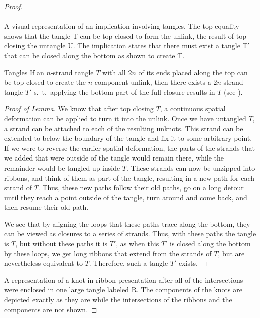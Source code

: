 \begin{paper}
\begin{proof}
{\vspace{-4em}\hspace{0.3in}\hspace{14.8ex}\\

\vspace{-4.3em}\hfill{}\\}
{A visual representation of an implication involving tangles.
The top equality shows that the tangle T can be top closed to
form the unlink, the result of top closing the untangle U.
The implication states that there must exist a tangle T' that can be closed
along the bottom as shown to create T.}

\begin{paperlem}{Tangles}
If an $n$-strand tangle $T$ with all $2n$ of its ends placed along the top can
be top closed to create the $n$-component unlink, then there exists a
$2n$-strand tangle $T'$ s.~t.~applying the bottom part of the full closure
results in $T$ (see \figLemma).
\end{paperlem}

\begin{proof}[Proof of Lemma]
We know that after top closing $T$, a continuous spatial deformation can be
applied to turn it into the unlink.
Once we have untangled $T$, a strand can be attached to each of the resulting
unknots.
This strand can be extended to below the boundary of the tangle and fix it to
some arbitrary point.
If we were to reverse the earlier spatial deformation, the parts of the strands
that we added that were outside of the tangle would remain there, while the
remainder would be tangled up inside $T$.
These strands can now be unzipped into ribbons, and think of them as part of the
tangle, resulting in a new path for each strand of $T$.
Thus, these new paths follow their old paths, go on a long detour until they
reach a point outside of the tangle, turn around and come back, and then resume
their old path.

We see that by aligning the loops that these paths trace along the bottom,
they can be viewed as closures to a series of strands.
Thus, with these paths the tangle is $T$, but without these paths it is $T'$,
as when this $T'$ is closed along the bottom by these loops, we get long ribbons
that extend from the strands of $T$, but are nevertheless equivalent to $T$.
Therefore, such a tangle $T'$ exists.
\end{proof}

{A representation of a knot in ribbon presentation after all of the
intersections were enclosed in one large tangle labeled R.
The components of the knots are depicted exactly as they are while the
intersections of the ribbons and the components are not shown.}


\end{proof}
\end{paper}
